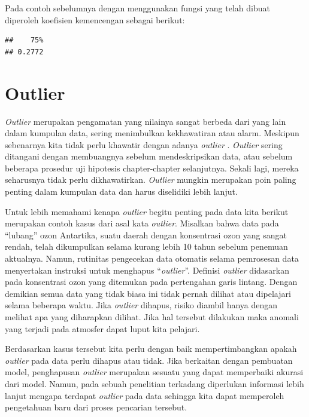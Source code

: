 \documentclass[]{book}
\newenvironment{Shaded}{\begin{snugshade}}{\end{snugshade}}
\newcommand{\KeywordTok}[1]{\textcolor[rgb]{0.13,0.29,0.53}{\textbf{#1}}}
\newcommand{\OperatorTok}[1]{\textcolor[rgb]{0.81,0.36,0.00}{\textbf{#1}}}
\newcommand{\NormalTok}[1]{#1}
\begin{document}
Pada contoh sebelumnya dengan menggunakan fungsi yang telah dibuat
diperoleh koefisien kemencengan sebagai berikut:

\begin{Shaded}
\end{Shaded}

\begin{verbatim}
##    75% 
## 0.2772
\end{verbatim}

\section{Outlier}\label{outlier}

\emph{Outlier} merupakan pengamatan yang nilainya sangat berbeda dari
yang lain dalam kumpulan data, sering menimbulkan kekhawatiran atau
alarm. Meskipun sebenarnya kita tidak perlu khawatir dengan adanya
\emph{outlier} . \emph{Outlier} sering ditangani dengan membuangnya
sebelum mendeskripsikan data, atau sebelum beberapa prosedur uji
hipotesis chapter-chapter selanjutnya. Sekali lagi, mereka seharusnya
tidak perlu dikhawatirkan. \emph{Outlier} mungkin merupakan poin paling
penting dalam kumpulan data dan harus diselidiki lebih lanjut.

Untuk lebih memahami kenapa \emph{outlier} begitu penting pada data kita
berikut merupakan contoh kasus dari asal kata \emph{outlier}. Misalkan
bahwa data pada ``lubang'' ozon Antartika, suatu daerah dengan
konsentrasi ozon yang sangat rendah, telah dikumpulkan selama kurang
lebih 10 tahun sebelum penemuan aktualnya. Namun, rutinitas pengecekan
data otomatis selama pemrosesan data menyertakan instruksi untuk
menghapus ``\emph{outlier}''. Definisi \emph{outlier} didasarkan pada
konsentrasi ozon yang ditemukan pada pertengahan garis lintang. Dengan
demikian semua data yang tidak biasa ini tidak pernah dilihat atau
dipelajari selama beberapa waktu. Jika \emph{outlier} dihapus, risiko
diambil hanya dengan melihat apa yang diharapkan dilihat. Jika hal
tersebut dilakukan maka anomali yang terjadi pada atmosfer dapat luput
kita pelajari.

Berdasarkan kasus tersebut kita perlu dengan baik mempertimbangkan
apakah \emph{outlier} pada data perlu dihapus atau tidak. Jika berkaitan
dengan pembuatan model, penghapusan \emph{outlier} merupakan sesuatu
yang dapat memperbaiki akurasi dari model. Namun, pada sebuah penelitian
terkadang diperlukan informasi lebih lanjut mengapa terdapat
\emph{outlier} pada data sehingga kita dapat memperoleh pengetahuan baru
dari proses pencarian tersebut.
\end{document}
